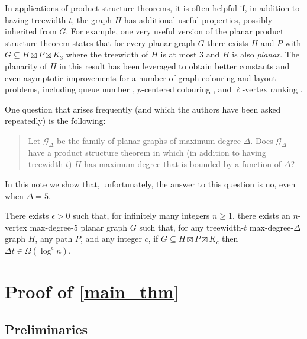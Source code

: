 \documentclass{patmorin}
\begin{document}
In applications of product structure theorems, it is often helpful if, in addition to having treewidth $t$, the graph $H$ has additional useful properties, possibly inherited from $G$.  For example, one very useful version of the planar product structure theorem states that for every planar graph $G$ there exists $H$ and $P$ with $G\subseteq H\boxtimes P\boxtimes K_3$ where the treewidth of $H$ is at most $3$ and $H$ is also \emph{planar}.  The planarity of $H$ in this result has been leveraged to obtain better constants and even asymptotic improvements for a number of graph colouring and layout problems, including queue number \cite{dujmovic.joret.ea:planar}, $p$-centered colouring \cite{debski.felsner.ea:improved}, and $\ell$-vertex ranking \cite{bose.dujmovic.ea:asymptotically}.

One question that arises frequently (and which the authors have been asked repeatedly) is the following:
\begin{quote}
  Let $\mathcal{G}_\Delta$ be the family of planar graphs of maximum degree $\Delta$.  Does $\mathcal{G}_\Delta$ have a product structure theorem in which (in addition to having treewidth $t$) $H$ has maximum degree that is bounded by a function of $\Delta$?
\end{quote}
In this note we show that, unfortunately, the answer to this question is no, even when $\Delta=5$.

\begin{thm}\label{main_thm}
  There exists $\epsilon > 0$ such that, for infinitely many integers $n\ge 1$, there exists an $n$-vertex max-degree-$5$ planar graph $G$ such that, for any treewidth-$t$ max-degree-$\Delta$ graph $H$, any path $P$, and any integer $c$, if $G\subseteq H\boxtimes P\boxtimes K_c$ then $\Delta t\in\Omega(\log^\epsilon n)$.
\end{thm}


\section{Proof of \cref{main_thm}}


\subsection{Preliminaries}
\end{document}
